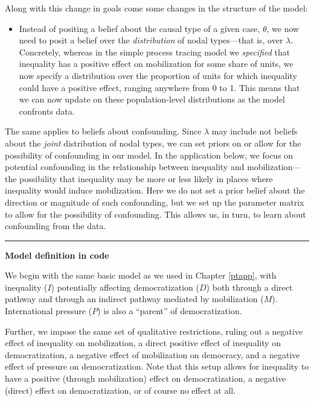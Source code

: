 \documentclass[
  12pt,
]{book}
\providecommand{\tightlist}{%
  \setlength{\itemsep}{0pt}\setlength{\parskip}{0pt}}
\begin{document}
Along with this change in goals come some changes in the structure of the model:

\begin{itemize}
\tightlist
\item
  Instead of positing a belief about the causal type of a given case, \(\theta\), we now need to posit a belief over the \emph{distribution} of nodal types---that is, over \(\lambda\). Concretely, whereas in the simple process tracing model we \emph{specified} that inequality has a positive effect on mobilization for some share of units, we now specify a distribution over the proportion of units for which inequality could have a positive effect, ranging anywhere from 0 to 1. This means that we can now update on these population-level distributions as the model confronts data.
\end{itemize}

The same applies to beliefs about confounding. Since \(\lambda\) may include not beliefs about the \emph{joint} distribution of nodal types, we can set priors on or allow for the possibility of confounding in our model. In the application below, we focus on potential confounding in the relationship between inequality and mobilization---the possibility that inequality may be more or less likely in places where inequality would induce mobilization. Here we do not set a prior belief about the direction or magnitude of such confounding, but we set up the parameter matrix to allow for the possibility of confounding. This allows us, in turn, to learn about confounding from the data.

\begin{center}\rule{0.5\linewidth}{0.5pt}\end{center}

\textbf{Model definition in code}

We begin with the same basic model as we used in Chapter \ref{ptapp}, with inequality (\(I\)) potentially affecting democratization (\(D\)) both through a direct pathway and through an indirect pathway mediated by mobilization (\(M\)). International pressure (\(P\)) is also a ``parent'' of democratization.

Further, we impose the same set of qualitative restrictions, ruling out a negative effect of inequality on mobilization, a direct positive effect of inequality on democratization, a negative effect of mobilization on democracy, and a negative effect of pressure on democratization. Note that this setup allows for inequality to have a positive (through mobilization) effect on democratization, a negative (direct) effect on democratization, or of course no effect at all.
\end{document}
